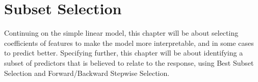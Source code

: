 \chapter{Subset Selection} \label{ch:subsetSelection}
Continuing on the simple linear model, this  chapter will be about selecting coefficients of features to make the model more interpretable, and in some cases to predict better. Specifying further, this chapter will be about identifying a subset of predictors that is believed to relate to the response, using Best Subset Selection and Forward/Backward Stepwise Selection.



